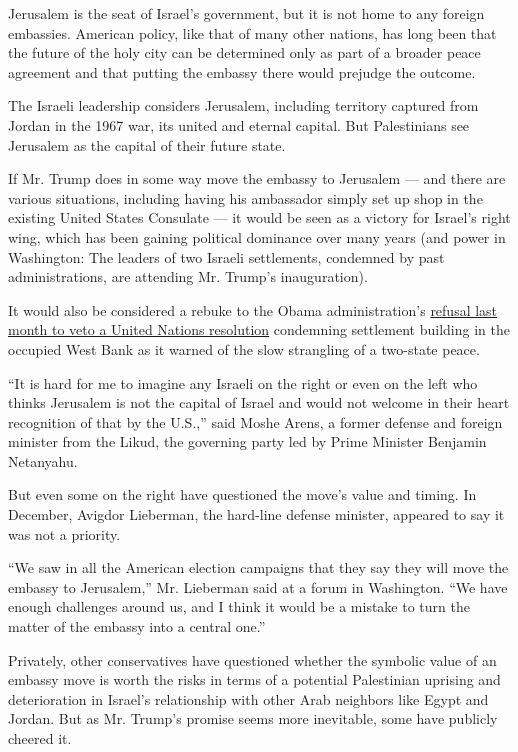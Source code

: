 Jerusalem is the seat of Israel's government, but it is not home to any
foreign embassies. American policy, like that of many other nations, has
long been that the future of the holy city can be determined only as
part of a broader peace agreement and that putting the embassy there
would prejudge the outcome.

The Israeli leadership considers Jerusalem, including territory captured
from Jordan in the 1967 war, its united and eternal capital. But
Palestinians see Jerusalem as the capital of their future state.

If Mr. Trump does in some way move the embassy to Jerusalem --- and
there are various situations, including having his ambassador simply set
up shop in the existing United States Consulate --- it would be seen as
a victory for Israel's right wing, which has been gaining political
dominance over many years (and power in Washington: The leaders of two
Israeli settlements, condemned by past administrations, are attending
Mr. Trump's inauguration).

It would also be considered a rebuke to the Obama administration's
\href{https://www.nytimes.com/2016/12/23/world/middleeast/israel-settlements-un-vote.html}{refusal
last month to veto a United Nations resolution} condemning settlement
building in the occupied West Bank as it warned of the slow strangling
of a two-state peace.

``It is hard for me to imagine any Israeli on the right or even on the
left who thinks Jerusalem is not the capital of Israel and would not
welcome in their heart recognition of that by the U.S.,'' said Moshe
Arens, a former defense and foreign minister from the Likud, the
governing party led by Prime Minister Benjamin Netanyahu.

But even some on the right have questioned the move's value and timing.
In December, Avigdor Lieberman, the hard-line defense minister, appeared
to say it was not a priority.

``We saw in all the American election campaigns that they say they will
move the embassy to Jerusalem,'' Mr. Lieberman said at a forum in
Washington. ``We have enough challenges around us, and I think it would
be a mistake to turn the matter of the embassy into a central one.''

Privately, other conservatives have questioned whether the symbolic
value of an embassy move is worth the risks in terms of a potential
Palestinian uprising and deterioration in Israel's relationship with
other Arab neighbors like Egypt and Jordan. But as Mr. Trump's promise
seems more inevitable, some have publicly cheered it.

